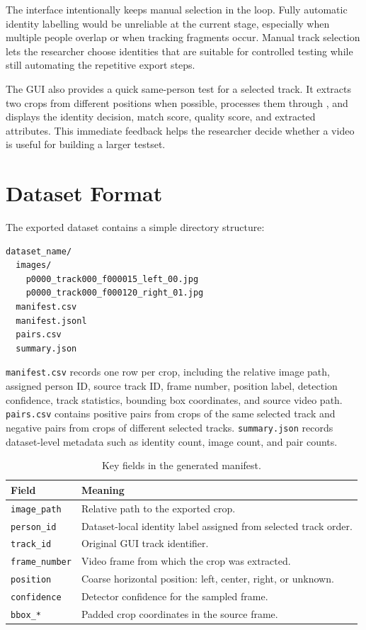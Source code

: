 The interface intentionally keeps manual selection in the loop. Fully automatic identity labelling would be unreliable at the current stage, especially when multiple people overlap or when tracking fragments occur. Manual track selection lets the researcher choose identities that are suitable for controlled testing while still automating the repetitive export steps.

The GUI also provides a quick same-person test for a selected track. It extracts two crops from different positions when possible, processes them through \systemname, and displays the identity decision, match score, quality score, and extracted attributes. This immediate feedback helps the researcher decide whether a video is useful for building a larger testset.

\section{Dataset Format}

The exported dataset contains a simple directory structure:

\begin{lstlisting}
dataset_name/
  images/
    p0000_track000_f000015_left_00.jpg
    p0000_track000_f000120_right_01.jpg
  manifest.csv
  manifest.jsonl
  pairs.csv
  summary.json
\end{lstlisting}

\texttt{manifest.csv} records one row per crop, including the relative image path, assigned person ID, source track ID, frame number, position label, detection confidence, track statistics, bounding box coordinates, and source video path. \texttt{pairs.csv} contains positive pairs from crops of the same selected track and negative pairs from crops of different selected tracks. \texttt{summary.json} records dataset-level metadata such as identity count, image count, and pair counts.

\begin{table}[htbp]
  \centering
  \caption{Key fields in the generated manifest.}
  \label{tab:manifest-fields}
  \begin{tabularx}{\textwidth}{lX}
    \toprule
    Field & Meaning \\
    \midrule
    \texttt{image\_path} & Relative path to the exported crop. \\
    \texttt{person\_id} & Dataset-local identity label assigned from selected track order. \\
    \texttt{track\_id} & Original GUI track identifier. \\
    \texttt{frame\_number} & Video frame from which the crop was extracted. \\
    \texttt{position} & Coarse horizontal position: left, center, right, or unknown. \\
    \texttt{confidence} & Detector confidence for the sampled frame. \\
    \texttt{bbox\_*} & Padded crop coordinates in the source frame. \\
    \bottomrule
  \end{tabularx}
\end{table}

